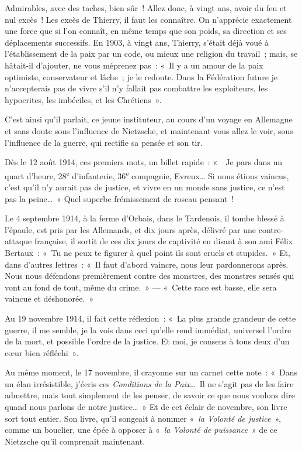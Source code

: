 \documentclass[french,twoside]{book} %
\begin{document}
Admirables, avec des taches, bien sûr ! Allez donc, à vingt ans, avoir du feu et nul excès ! Les excès de Thierry, il faut les connaître. On n’apprécie exactement une force que si l’on connaît, en même temps que son poids, sa direction et ses déplacements successifs. En 1903, à vingt ans, Thierry, s’était déjà voué à l’établissement de la paix par un code, ou mieux une religion du travail ; mais, se hâtait-il d’ajouter, ne vous méprenez pas : « Il y a un amour de la paix optimiste, conservateur et lâche ; je le redoute. Dans la Fédération future je n’accepterais pas de vivre s’il n’y fallait pas combattre les exploiteurs, les hypocrites, les imbéciles, et les Chrétiens ».‌\par
C’est ainsi qu’il parlait, ce jeune instituteur, au cours d’un voyage en Allemagne et sans doute sous l’influence de Nietzsche, et maintenant vous allez le voir, sous l’influence de la guerre, qui rectifie sa pensée et son tir.‌\par
Dès le 12 août 1914, ces premiers mots, un billet rapide : «  Je pars dans un quart d’heure, 28\textsuperscript{e} d’infanterie, 36\textsuperscript{e} compagnie, Evreux… Si nous étions vaincus, c’est qu’il n’y aurait pas de justice, et vivre en un monde sans justice, ce n’est pas la peine… » Quel superbe frémissement de roseau pensant !‌\par
Le 4 septembre 1914, à la ferme d’Orbais, dans le Tardenois, il tombe blessé à l’épaule, est pris par les Allemands, et dix jours après, délivré par une contre-attaque française, il sortit de ces dix jours de captivité en disant à son ami Félix Bertaux : « Tu ne peux te figurer à quel point ils sont cruels et stupides. » Et, dans d’autres lettres : « Il faut d’abord vaincre, nous leur pardonnerons après. Nous nous défendons premièrement contre des monstres, des monstres sensés qui vont au fond de tout, même du crime. » — « Cette race est basse, elle sera vaincue et déshonorée. »‌\par
Au 19 novembre 1914, il fait cette réflexion : « La plus grande grandeur de cette guerre, il me semble, je la vois dans ceci qu’elle rend immédiat, universel l’ordre de la mort, et possible l’ordre de la justice. Et moi, je consens à tous deux d’un cœur bien réfléchi ».‌\par
Au même moment, le 17 novembre, il crayonne sur un carnet cette note : « Dans un élan irrésistible, j’écris ces {\itshape Conditions de la Paix}… Il ne s’agit pas de les faire admettre, mais tout simplement de les penser, de savoir ce que nous voulons dire quand nous parlons de notre justice… » Et de cet éclair de novembre, son livre sort tout entier. Son livre, qu’il songeait à nommer « {\itshape la Volonté de justice} », comme un bouclier, une épée à opposer à « {\itshape la Volonté de puissance} » de ce Nietzsche qu’il comprenait maintenant.‌\par
\end{document}
